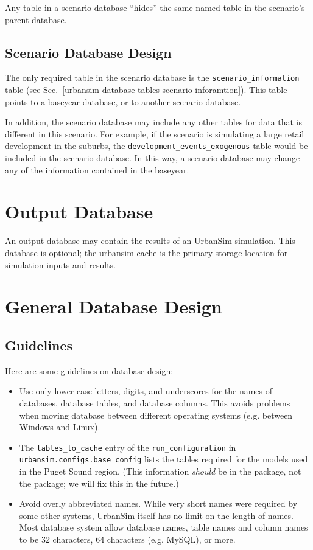 Any table in a scenario database ``hides'' the same-named table in the
scenario's parent database.

\subsection{Scenario Database Design}

The only required table in the scenario database is the
\verb|scenario_information| table (see Sec.~\ref{urbansim-database-tables-scenario-inforamtion}).
This table points to a baseyear database, or
to another scenario database.

In addition, the scenario database may include any other tables for data that
is different in this scenario. For example, if the scenario is simulating a
large retail development in the suburbs, the \verb|development_events_exogenous| table
would be included in the scenario database.  In this way, a scenario database
may change any of the information contained in the baseyear.

\section{Output Database}

An output database may contain the results of an UrbanSim simulation.  This
database is optional; the urbansim cache is the primary storage location for
simulation inputs and results.

\section{General Database Design}

\subsection{Guidelines}

Here are some guidelines on database design:

\begin{itemize}
\item Use only lower-case letters, digits, and underscores for the names of
databases, database tables, and database columns. This avoids problems when
moving database between different operating systems (e.g. between Windows \windowsindex and
Linux). \linuxindex
\item The \verb|tables_to_cache| entry of the \verb|run_configuration| in
\verb|urbansim.configs.base_config| lists the tables required for the models used in
the Puget Sound region.  (This information \emph{should} be in the
 \psrcindex package, not the  package; we will fix this in
the future.)
\item Avoid overly abbreviated names.  While very short names were required by
some other systems, UrbanSim itself has no limit on the length of names. Most
database system allow database names, table names and column names to be 32
characters, 64 characters (e.g. MySQL), \mysqlindex or more.
\end{itemize}

